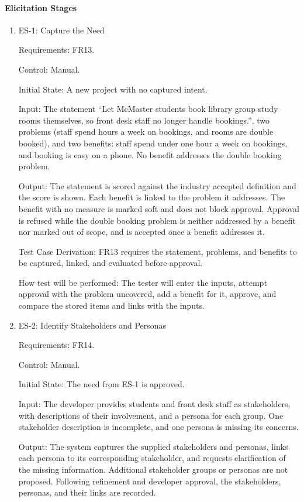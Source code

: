 \documentclass[12pt, titlepage]{article}
\begin{document}
\paragraph{Elicitation Stages}

\begin{enumerate}

\item{ES-1: Capture the Need\\}

Requirements: FR13.

Control: Manual.

Initial State: A new project with no captured intent.

Input: The statement ``Let McMaster students book library group study rooms
themselves, so front desk staff no longer handle bookings.'', two problems
(staff spend hours a week on bookings, and rooms are double booked), and two
benefits: staff spend under one hour a week on bookings, and booking is easy on
a phone. No benefit addresses the double booking problem.

Output: The statement is scored against the industry accepted definition and the score
is shown. Each benefit is linked to the problem it addresses. The benefit with
no measure is marked soft and does not block approval. Approval is refused
while the double booking problem is neither addressed by a benefit nor marked
out of scope, and is accepted once a benefit addresses it.

Test Case Derivation: FR13 requires the statement, problems, and benefits to
be captured, linked, and evaluated before approval. 

How test will be performed: The tester will enter the inputs, attempt
approval with the problem uncovered, add a benefit for it, approve, and
compare the stored items and links with the inputs.

\item{ES-2: Identify Stakeholders and Personas\\}

Requirements: FR14.

Control: Manual.

Initial State: The need from ES-1 is approved.

Input: The developer provides students and front desk staff as stakeholders,
with descriptions of their involvement, and a persona for each group. One
stakeholder description is incomplete, and one persona is missing its concerns.

Output: The system captures the supplied stakeholders and personas, links each
persona to its corresponding stakeholder, and requests clarification of the
missing information. Additional stakeholder groups or personas are not proposed.
Following refinement and developer approval, the stakeholders, personas, and
their links are recorded.


\end{enumerate}
\end{document}
